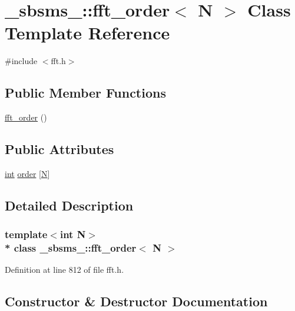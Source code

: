 \hypertarget{class__sbsms___1_1fft__order}{}\section{\+\_\+sbsms\+\_\+\+:\+:fft\+\_\+order$<$ N $>$ Class Template Reference}
\label{class__sbsms___1_1fft__order}


{\ttfamily \#include $<$fft.\+h$>$}

\subsection*{Public Member Functions}
\begin{DoxyCompactItemize}
\item 
\hyperlink{class__sbsms___1_1fft__order_ac2c0399b99fa792bced6da7ceea9c860}{fft\+\_\+order} ()
\end{DoxyCompactItemize}
\subsection*{Public Attributes}
\begin{DoxyCompactItemize}
\item 
\hyperlink{xmltok_8h_a5a0d4a5641ce434f1d23533f2b2e6653}{int} \hyperlink{class__sbsms___1_1fft__order_a8dab31ecd0c2f9e3af9a43d9344c9852}{order} \mbox{[}\hyperlink{rfft2d_test_m_l_8m_af6d1246b147a7c5763d9fc83082020ff}{N}\mbox{]}
\end{DoxyCompactItemize}


\subsection{Detailed Description}
\subsubsection*{template$<$int N$>$\\*
class \+\_\+sbsms\+\_\+\+::fft\+\_\+order$<$ N $>$}



Definition at line 812 of file fft.\+h.



\subsection{Constructor \& Destructor Documentation}
